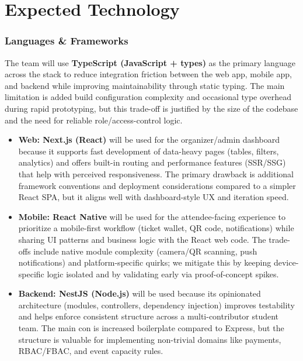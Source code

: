 \documentclass{article}
\begin{document}
\section{Expected Technology}

\subsubsection*{Languages \& Frameworks} 
The team will use \textbf{TypeScript (JavaScript + types)} as the primary language across the stack to reduce integration friction between the web app, mobile app, and backend while improving maintainability through static typing. The main limitation is added build configuration complexity and occasional type overhead during rapid prototyping, but this trade-off is justified by the size of the codebase and the need for reliable role/access-control logic.

\begin{itemize}
  \item \textbf{Web: Next.js (React)} will be used for the organizer/admin dashboard because it supports fast development of data-heavy pages (tables, filters, analytics) and offers built-in routing and performance features (SSR/SSG) that help with perceived responsiveness. The primary drawback is additional framework conventions and deployment considerations compared to a simpler React SPA, but it aligns well with dashboard-style UX and iteration speed.
  \item \textbf{Mobile: React Native} will be used for the attendee-facing experience to prioritize a mobile-first workflow (ticket wallet, QR code, notifications) while sharing UI patterns and business logic with the React web code. The trade-offs include native module complexity (camera/QR scanning, push notifications) and platform-specific quirks; we mitigate this by keeping device-specific logic isolated and by validating early via proof-of-concept spikes.
  \item \textbf{Backend: NestJS (Node.js)} will be used because its opinionated architecture (modules, controllers, dependency injection) improves testability and helps enforce consistent structure across a multi-contributor student team. The main con is increased boilerplate compared to Express, but the structure is valuable for implementing non-trivial domains like payments, RBAC/FBAC, and event capacity rules.
\end{itemize}
\end{document}

